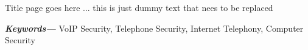 Title page goes here ... this is just dummy text that nees to be replaced

\providecommand{\keywords}[1]{\textbf{\textit{Keywords---}} #1} 
\keywords{VoIP Security, Telephone Security, Internet Telephony, Computer Security}